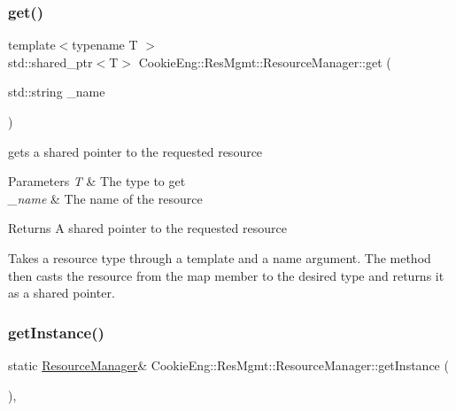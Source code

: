\subsubsection{\texorpdfstring{get()}{get()}}
{\footnotesize\ttfamily template$<$typename T $>$ \\
std\+::shared\+\_\+ptr$<$T$>$ Cookie\+Eng\+::\+Res\+Mgmt\+::\+Resource\+Manager\+::get (\begin{DoxyParamCaption}\item[{std\+::string}]{\+\_\+name }\end{DoxyParamCaption})\hspace{0.3cm}{\ttfamily [inline]}}



gets a shared pointer to the requested resource 


\begin{DoxyParams}{Parameters}
{\em T} & The type to get \\
\hline
{\em \+\_\+name} & The name of the resource \\
\hline
\end{DoxyParams}
\begin{DoxyReturn}{Returns}
A shared pointer to the requested resource
\end{DoxyReturn}
Takes a resource type through a template and a name argument. The method then casts the resource from the map member to the desired type and returns it as a shared pointer. \mbox{\label{class_cookie_eng_1_1_res_mgmt_1_1_resource_manager_a3ffc6fb81b9e9562d9c702b9e02c9f13}} 
\subsubsection{\texorpdfstring{get\+Instance()}{getInstance()}}
{\footnotesize\ttfamily static \hyperlink{class_cookie_eng_1_1_res_mgmt_1_1_resource_manager}{Resource\+Manager}\& Cookie\+Eng\+::\+Res\+Mgmt\+::\+Resource\+Manager\+::get\+Instance (\begin{DoxyParamCaption}{ }\end{DoxyParamCaption})\hspace{0.3cm}{\ttfamily [inline]}, {\ttfamily [static]}}



